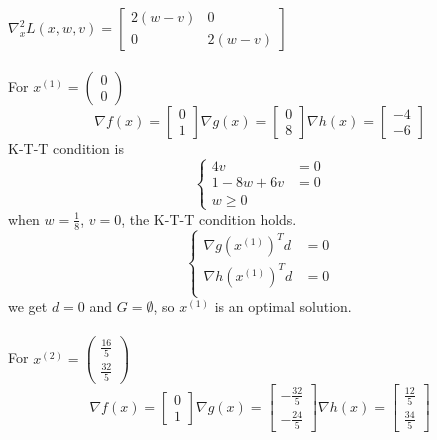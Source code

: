 \documentclass[paper=a4, fontsize=11pt]{scrartcl} %
\numberwithin{equation}{section} %
\numberwithin{figure}{section} %
\numberwithin{table}{section} %
\begin{document}
$\nabla^2_xL(x,w,v)=\begin{bmatrix}2(w-v) &0\\0& 2(w-v)\end{bmatrix}$\\
\\
For $x^{(1)}=\begin{pmatrix} 0 \\ 0\end{pmatrix}$
\begin{equation} \nonumber
\nabla f(x) = \begin{bmatrix}0 \\ 1\end{bmatrix}
\nabla g(x) = \begin{bmatrix}0 \\ 8\end{bmatrix}
\nabla h(x) = \begin{bmatrix}-4 \\ -6\end{bmatrix}
\end{equation}
K-T-T condition is
\begin{equation} \nonumber
\left\{
\begin{aligned}
4v &= 0\\
1-8w+6v &= 0\\
w \geq 0
\end{aligned}
\right.
\end{equation}
when $w=\frac{1}{8}$, $v=0$, the K-T-T condition holds.\\
\begin{equation} \nonumber
\left\{
\begin{aligned}
\nabla g(x^{(1)})^Td &= 0\\
\nabla h(x^{(1)})^Td &= 0\\
\end{aligned}
\right.
\end{equation}
we get $d=0$ and $G=\emptyset$, so $x^{(1)}$ is an optimal solution.\\
\\
For $x^{(2)}=\begin{pmatrix} \frac{16}{5} \\ \frac{32}{5}\end{pmatrix}$
\begin{equation} \nonumber
\nabla f(x) = \begin{bmatrix}0 \\ 1\end{bmatrix}
\nabla g(x) = \begin{bmatrix}-\frac{32}{5}\\ -\frac{24}{5}\end{bmatrix}
\nabla h(x) = \begin{bmatrix}\frac{12}{5}\\ \frac{34}{5}\end{bmatrix}
\end{equation}
\end{document}
